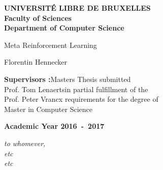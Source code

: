 \documentclass[11pt,a4paper,oneside]{book}
\begin{document}

\frontmatter
\begin{titlepage}
\begin{center}
\textbf{UNIVERSIT\'E LIBRE DE BRUXELLES}\\
\textbf{Faculty of Sciences}\\
\textbf{Department of Computer Science}
\vfill{}\vfill{}

{\Huge  Meta Reinforcement Learning}

{\Huge \par}
\begin{center}{\LARGE Florentin Hennecker}\end{center}{\Huge \par}
\vfill{}\vfill{}
\begin{flushright}{\large \textbf{Supervisors :}}\hfill{}{\large Masters Thesis submitted}\\
{\large Prof. Tom Lenaerts}\hfill{}{\large in partial fulfillment of the}\\
{\large Prof. Peter Vrancx}
\hfill{}{\large requirements for the degree of}\\
\hfill{}{\large Master in Computer Science}\end{flushright}{\large\par}
\vfill{}\vfill{}\enlargethispage{3cm}
\textbf{Academic Year 2016~-~2017}
\end{center}
\end{titlepage}
\newpage
\thispagestyle{empty} 
\null


\newenvironment{vcenterpage}
{\newpage\thispagestyle{empty} 
\vspace*{\fill}}
{\vspace*{\fill}\par\pagebreak}

\begin{vcenterpage}
\begin{flushright}
    \large\em\null\vskip1in 
    to whomever, \\
    etc\\
    etc\vfill
\end{flushright}
\end{vcenterpage}
\thispagestyle{empty}
\vspace*{5cm}

\end{document}
